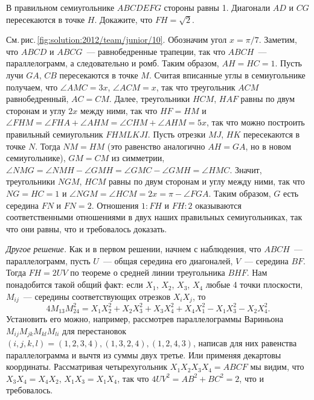 \problem{}
В правильном семиугольнике $ABCDEFG$ стороны равны 1.
Диагонали $AD$ и $CG$ пересекаются в точке $H$.
Докажите, что $FH = \sqrt{2}$.

%
\label{solution:2012/team/junior/10}%
См.\,рис.\,\ref{fig:solution:2012/team/junior/10}.
Обозначим угол $x = \pi / 7$.
Заметим, что $ABCD$ и $ABCG$~--- равнобедренные трапеции,
так что $ABCH$~--- параллелограмм, а следовательно и ромб.
Таким образом, $AH = HC = 1$.
Пусть лучи $GA$, $CB$ пересекаются в точке $M$.
Считая вписанные углы в семиугольнике получаем,
что $\angle AMC = 3 x$, $\angle ACM = x$,
так что треугольник $ACM$ равнобедренный, $AC = CM$.
Далее, треугольники $HCM$, $HAF$ равны по двум сторонам и
углу $2 x$ между ними, так что $HF = HM$ и
$\angle FHM = \angle FHA + \angle AHM = \angle CHM + \angle AHM = 5 x$,
так что можно построить правильный семиугольник $FHMLKJI$.
Пусть отрезки $MJ$, $HK$ пересекаются в точке $N$.
Тогда $NM = HM$
(это равенство аналогично $AH = GA$, но в новом семиугольнике),
$GM = CM$ из симметрии,
$\angle NMG = \angle NMH - \angle GMH = \angle GMC - \angle GMH = \angle HMC$.
Значит, треугольники $NGM$, $HCM$ равны по двум сторонам и углу между ними,
так что $NG = HC = 1$ и $\angle NGM = \angle HCM = 2 x = \pi - \angle FGA$.
Таким образом, $G$ есть середина $FN$ и $FN = 2$.
Отношения $1 : FH$ и $FH : 2$ оказываются соответственными отношениями в
двух наших правильных семиугольниках, так что они равны, что и требовалось
доказать.
\par
\emph{Другое решение.}
Как и в первом решении, начнем с наблюдения, что $ABCH$~--- параллелограмм,
пусть $U$~--- общая середина его диагоналей, $V$~--- середина $BF$.
Тогда $FH = 2 UV$ по теореме о средней линии треугольника $BHF$.
Нам понадобится такой общий факт:
если $X_1$, $X_2$, $X_3$, $X_4$ любые 4 точки плоскости,
$M_{ij}$~--- середины соответствующих отрезков $X_iX_j$, то
\[
    4 M_{13}M_{24}^2
=
    X_1X_2^2 + X_2X_3^2 + X_3X_4^2 + X_4X_1^2 - X_1X_3^2 - X_2X_4^2
.\] 
Установить его можно, например, рассмотрев параллелограммы Вариньона $M_{ij} M_{jk} M_{kl} M_{li}$ для перестановок
$(i, j, k, l) = (1, 2, 3, 4), (1, 3, 2, 4), (1, 2, 4, 3)$,
написав для них равенства параллелограмма и вычтя из суммы двух третье.
Или применяя декартовы координаты.
Рассматривая четырехугольник $X_1 X_2 X_3 X_4 = ABCF$ мы видим, что
$X_3 X_4 = X_4 X_2$, $X_1 X_3 = X_1 X_4$,
так что $4 UV^2 = AB^2 + BC^2 = 2$, что и требовалось.

\endproblem
